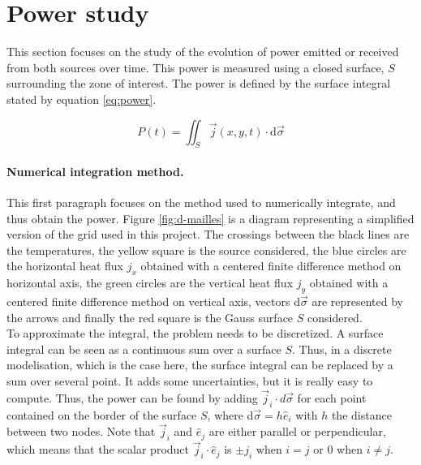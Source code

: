 \documentclass[a4paper,12pt,twoside]{article}
\begin{document}
\label{par:heatflux}

\section{Power study}
This section focuses on the study of the evolution of power emitted or received from both sources over time.
This power is measured using a closed surface, $S$ surrounding the zone of interest.
The power is defined by the surface integral stated by equation \eqref{eq:power}.

\begin{equation}
  P(t) = \iint_S \vec{j}(x,y,t)\cdot \text{d}\vec{\sigma}
  \label{eq:power}
\end{equation}

\paragraph{Numerical integration method.}
This first paragraph focuses on the method used to numerically integrate, and thus obtain the power.
Figure \ref{fig:d-mailles} is a diagram representing a simplified version of the grid used in this project.
The crossings between the black lines are the temperatures, the yellow square is the source considered, the blue circles are the horizontal heat flux $j_x$ obtained with a centered finite difference method on horizontal axis, the green circles are the vertical heat flux $j_y$ obtained with a centered finite difference method on vertical axis, vectors d$\vec{\sigma}$ are represented by the arrows and finally the red square is the Gauss surface $S$ considered.\\
To approximate the integral, the problem needs to be discretized.
A surface integral can be seen as a continuous sum over a surface $S$.
Thus, in a discrete modelisation, which is the case here, the surface integral can be replaced by a sum over several point.
It adds some uncertainties, but it is really easy to compute.
Thus, the power can be found by adding $\vec{j}_i\cdot d\vec{\sigma}$ for each point contained on the border of the surface $S$, where d$\vec{\sigma} = h\hat{e}_i$ with $h$ the distance between two nodes.
Note that $\vec{j}_i$ and $\hat{e}_j$ are either parallel or perpendicular, which means that the scalar product $\vec{j}_i\cdot\hat{e}_j$ is $\pm j_i$ when $i=j$ or $0$ when $i \neq j$.
\end{document}
